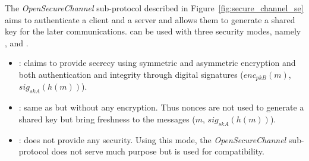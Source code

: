 \newcommand{\gereq}{GEReq}
\newcommand{\geres}{GERes}
\newcommand{\oscreq}{OSCReq}
\newcommand{\oscres}{OSCRes}


The {\em OpenSecureChannel} sub-protocol described in
Figure~\ref{fig:secure_channel_se} aims to authenticate a client and
a server and allows them to generate a shared key for the later communications.
\opcua can be used with three security modes, namely {\em \smn}, {\em \sms} and
{\em \smse}.
\vspace{-.5em}
\begin{itemize}
    \item {\em \smse}: claims to provide secrecy using symmetric and
      asymmetric encryption and both authentication and integrity
      through digital signatures (\eg $enc_{pkB}(m)$, $sig_{skA}(h(m))$).
  \item {\em \sms}: same as {\em \smse} but without any encryption.  Thus
      nonces are not used to generate a shared key but bring freshness
      to the messages (\eg $m$, $sig_{skA}(h(m))$).
  \item {\em \smn}: does not provide any security.  Using this mode, the
      {\em OpenSecureChannel} sub-protocol does not serve much
      purpose but is used for compatibility.
\end{itemize}

